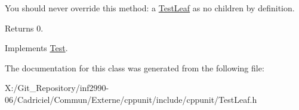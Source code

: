 You should never override this method\-: a \hyperlink{class_test_leaf}{Test\-Leaf} as no children by definition.

\begin{DoxyReturn}{Returns}
0. 
\end{DoxyReturn}


Implements \hyperlink{class_test_a7aaab95037b7222573471074c56df85b}{Test}.



The documentation for this class was generated from the following file\-:\begin{DoxyCompactItemize}
\item 
X\-:/\-Git\-\_\-\-Repository/inf2990-\/06/\-Cadriciel/\-Commun/\-Externe/cppunit/include/cppunit/Test\-Leaf.\-h\end{DoxyCompactItemize}
